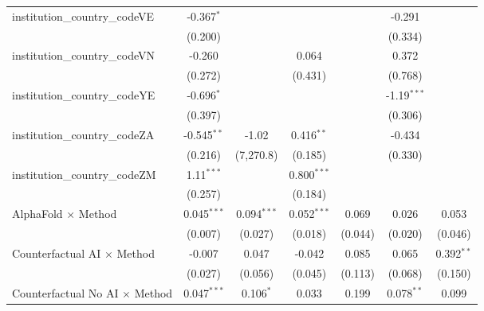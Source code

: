 \begin{tabular}{lcccccc}
   institution\_country\_codeVE          & -0.367$^{*}$   &               &                &                & -0.291         &   \\   
                                         & (0.200)        &               &                &                & (0.334)        &   \\   
   institution\_country\_codeVN          & -0.260         &               & 0.064          &                & 0.372          &   \\   
                                         & (0.272)        &               & (0.431)        &                & (0.768)        &   \\   
   institution\_country\_codeYE          & -0.696$^{*}$   &               &                &                & -1.19$^{***}$  &   \\   
                                         & (0.397)        &               &                &                & (0.306)        &   \\   
   institution\_country\_codeZA          & -0.545$^{**}$  & -1.02         & 0.416$^{**}$   &                & -0.434         &   \\   
                                         & (0.216)        & (7,270.8)     & (0.185)        &                & (0.330)        &   \\   
   institution\_country\_codeZM          & 1.11$^{***}$   &               & 0.800$^{***}$  &                &                &   \\   
                                         & (0.257)        &               & (0.184)        &                &                &   \\   
   AlphaFold $\times$ Method             & 0.045$^{***}$  & 0.094$^{***}$ & 0.052$^{***}$  & 0.069          & 0.026          & 0.053\\   
                                         & (0.007)        & (0.027)       & (0.018)        & (0.044)        & (0.020)        & (0.046)\\   
   Counterfactual AI $\times$ Method     & -0.007         & 0.047         & -0.042         & 0.085          & 0.065          & 0.392$^{**}$\\   
                                         & (0.027)        & (0.056)       & (0.045)        & (0.113)        & (0.068)        & (0.150)\\   
   Counterfactual No AI $\times$ Method  & 0.047$^{***}$  & 0.106$^{*}$   & 0.033          & 0.199          & 0.078$^{**}$   & 0.099\\   

\end{tabular}

